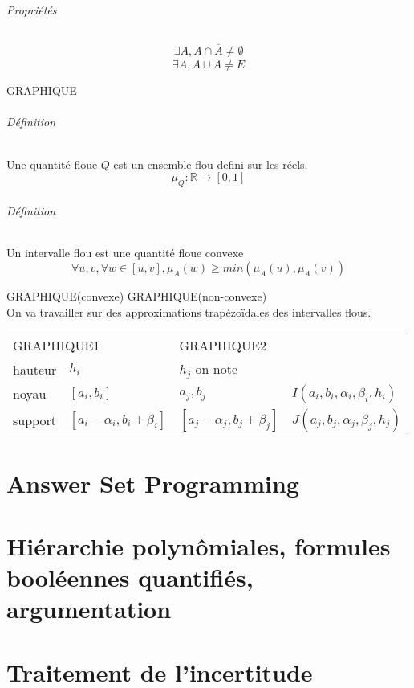\documentclass[a4paper,12pt]{article}
\begin{document}
	\paragraph{Propriétés}
	$$ \exists A, A \cap \overline{A} \ne \emptyset $$
	$$ \exists A, A \cup \overline{A} \ne E $$
	
	GRAPHIQUE
	
	\paragraph{Définition} 
	Une quantité floue $Q$ est un ensemble flou defini sur les réels.\\
	$$ \mu_Q : \mathbb{R} \rightarrow [0,1] $$	
	
	\paragraph{Définition}
	Un intervalle flou est une quantité floue convexe
	$$ \forall u,v, \forall w \in [u,v], \mu_A(w) \ge min(\mu_A(u), \mu_A(v)) $$
	
	GRAPHIQUE(convexe)  GRAPHIQUE(non-convexe)\\
	
	On va travailler sur des approximations trapézoïdales des intervalles flous.\\
	
	\begin{tabular}{llll}
	\multicolumn{2}{l}{GRAPHIQUE1} & GRAPHIQUE2 & \\
	hauteur & $h_i$ & $h_j$ on note \\
	noyau & $[a_i,b_i]$ & $a_j,b_j$ & $I(a_i,b_i,\alpha_i,\beta_i,h_i)$\\
	support & $[a_i-\alpha_i,b_i+\beta_i]$ & $[a_j-\alpha_j,b_j+\beta_j]$ & $J(a_j,b_j,\alpha_j,\beta_j,h_j) $ 
	
	\end{tabular}
	
	
	
	\part{Answer Set Programming}
	\part{Hiérarchie polynômiales, formules booléennes quantifiés, argumentation}
	\part{Traitement de l'incertitude}
	
\end{document}
